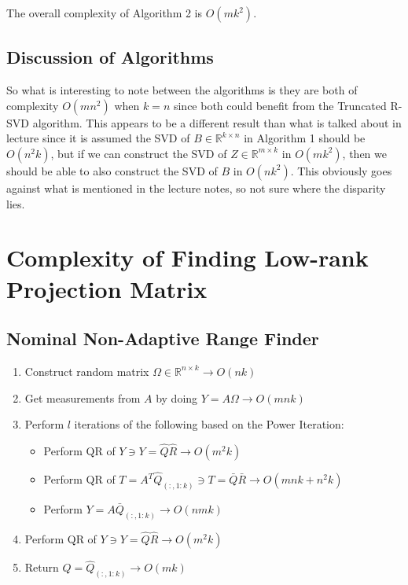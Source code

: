 \documentclass{article}[11pt]
\begin{document}
   The overall complexity of Algorithm 2 is $O(mk^2)$.
   
\subsection{Discussion of Algorithms}
So what is interesting to note between the algorithms is they are both of complexity $O(m n^2)$ when $k = n$ since both could benefit from the Truncated R-SVD algorithm. This appears to be a different result than what is talked about in lecture since it is assumed the SVD of $B \in \mathbb{R}^{k \times n}$ in Algorithm 1 should be $O(n^2k)$, but if we can construct the SVD of $Z \in \mathbb{R}^{m \times k}$  in $O(mk^2)$, then we should be able to also construct the SVD of $B$ in $O(nk^2)$. This obviously goes against what is mentioned in the lecture notes, so not sure where the disparity lies.
   
   \newpage
   \section{ Complexity of Finding Low-rank Projection Matrix }
   \subsection{Nominal Non-Adaptive Range Finder}
   \begin{enumerate}
   \item Construct random matrix $\Omega \in \mathbb{R}^{n \times k} \rightarrow O(nk)$
   \item Get measurements from $A$ by doing $Y = A\Omega \rightarrow O(mnk)$
   \item Perform $l$ iterations of the following based on the Power Iteration:
   		\begin{itemize}
   		\item Perform QR of $Y \ni Y = \hat{Q} \hat{R} \rightarrow O(m^2k)$
   		\item Perform QR of $T = A^T \hat{Q}_{(:,1:k)}  \ni T = \bar{Q}\bar{R} \rightarrow O(mnk + n^2k)$
   		\item Perform $Y = A \bar{Q}_{(:,1:k)} \rightarrow O(nmk)$
   		\end{itemize}
   \item Perform QR of $Y \ni Y = \hat{Q} \hat{R} \rightarrow O(m^2k)$
   \item Return $Q = \hat{Q}_{(:,1:k)} \rightarrow O(mk)$
   \end{enumerate}
   
\end{document}
